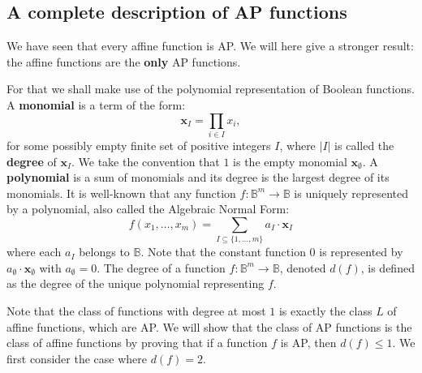 \subsection{A complete description of AP functions}

We have seen that every affine function is AP. We will here give a stronger
result: the affine functions are the \textbf{only} AP functions.

For that we shall make use of the  polynomial representation of Boolean functions.
A \textbf{ monomial} is a term of the form:
$$
\mathbf{x}_I=\underset{i\in I}{\prod}x_i, $$ for some possibly empty finite set of
positive integers $I$, where $|I|$ is called the \textbf{degree} of
$\mathbf{x}_I$.   We take the convention that $1$ is the empty monomial
$\mathbf{x}_\emptyset $. A \textbf{ polynomial} is a sum of monomials and its
degree is the largest degree of its monomials.  It is well-known
\cite{StoneAlgebra1936,ZhegalkinAlgebra1927} that any function
$f:\mathbb{B}^m\rightarrow \mathbb{B}$ is uniquely represented by a polynomial,
also called the Algebraic Normal Form: $$f(x_1,\ldots,x_m)=\sum_{I\subseteq
\{1,\ldots,m\}}a_I\cdot \mathbf{x}_I$$ where each $a_I$ belongs to
$\mathbb{B}$. Note that the constant function $0$ is represented by
$a_\emptyset\cdot \mathbf{x}_\emptyset$ with $a_\emptyset =0$. The degree of a
function $f:\mathbb{B}^m\rightarrow \mathbb{B}$, denoted $d(f)$, is defined as
the degree of the unique polynomial representing $f$.

Note that the class of functions with degree at most $1$ is exactly the class
$L$ of affine functions, which are AP. We will show that the class of AP
functions is the class of affine functions by proving that if a function $f$ is
AP, then $d(f)\leq 1$. We first consider the case where $d(f) = 2$.


